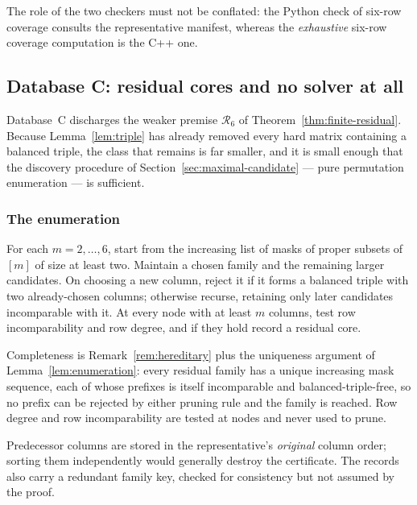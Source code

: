 \documentclass[11pt,letterpaper]{article}
\numberwithin{equation}{section}
\theoremstyle{definition}
\theoremstyle{remark}
\newcommand{\dbC}{\textsf{C}}
\begin{document}
The role of the two checkers must not be conflated: the Python check of
six-row coverage consults the representative manifest, whereas the
\emph{exhaustive} six-row coverage computation is the C++ one.

\subsection{Database \dbC{}: residual cores and no solver at all}
\label{sec:db-residual}
Database~\dbC{} discharges the weaker premise $\mathcal R_6$ of
Theorem~\ref{thm:finite-residual}. Because Lemma~\ref{lem:triple} has already
removed every hard matrix containing a balanced triple, the class that
remains is far smaller, and it is small enough that the discovery procedure of
Section~\ref{sec:maximal-candidate} --- pure permutation enumeration --- is
sufficient.

\subsubsection{The enumeration}
For each $m=2,\ldots,6$, start from the increasing list of masks of proper
subsets of $[m]$ of size at least two. Maintain a chosen family and the
remaining larger candidates. On choosing a new column, reject it if it forms
a balanced triple with two already-chosen columns; otherwise recurse,
retaining only later candidates incomparable with it. At every node with at
least $m$ columns, test row incomparability and row degree, and if they hold
record a residual core.

Completeness is Remark~\ref{rem:hereditary} plus the uniqueness argument of
Lemma~\ref{lem:enumeration}: every residual family has a unique increasing
mask sequence, each of whose prefixes is itself incomparable and
balanced-triple-free, so no prefix can be rejected by either pruning rule and
the family is reached. Row degree and row incomparability are tested at nodes
and never used to prune.

Predecessor columns are stored in the representative's \emph{original} column
order; sorting them independently would generally destroy the certificate.
The records also carry a redundant family key, checked for consistency but
not assumed by the proof.
\end{document}
